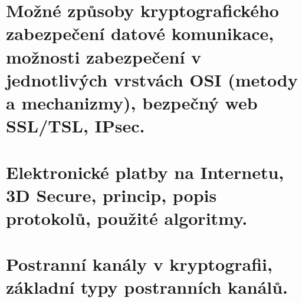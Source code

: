 \clearpage
\section{Možné způsoby kryptografického zabezpečení datové komunikace, možnosti zabezpečení v jednotlivých vrstvách OSI (metody a mechanizmy), bezpečný web SSL/TSL, IPsec.}

\clearpage
\section{Elektronické platby na Internetu, 3D Secure, princip, popis protokolů, použité algoritmy.}

\clearpage
\section{Postranní kanály v kryptografii, základní typy postranních kanálů.}
